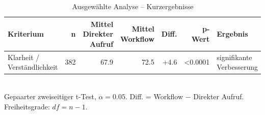 \begin{table}[htbp]
\centering
\caption{Ausgewählte Analyse -- Kurzergebnisse}
\begin{tabular}{lrrrrrl}
\toprule
Kriterium & n & Mittel Direkter Aufruf & Mittel Workflow & Diff. & p-Wert & Ergebnis \\
\midrule
Klarheit / Verständlichkeit & 382 & 67.9 & 72.5 & +4.6 & <0.0001 & signifikante Verbesserung \\
\bottomrule
\end{tabular}
\\[2mm]
\footnotesize Gepaarter zweiseitiger t-Test, $\alpha=0.05$. Diff. = Workflow $-$ Direkter Aufruf. Freiheitsgrade: $df=n-1$.
\end{table}
